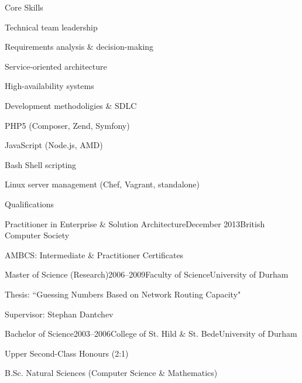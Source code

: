 \documentclass{cv}
\begin{document}
\begin{rSection}{Core Skills}

\begin{rSubsection}{}{}{}{}
\item Technical team leadership
\item Requirements analysis \& decision-making
\item Service-oriented architecture
\item High-availability systems
\item Development methodoligies \& SDLC
\item PHP5 (Composer, Zend, Symfony)
\item JavaScript (Node.js, AMD)
\item Bash Shell scripting
\item Linux server management (Chef, Vagrant, standalone)
\end{rSubsection}

\end{rSection}


\begin{rSection}{Qualifications}

\begin{rSubsection}{Practitioner in Enterprise \& Solution Architecture}{December 2013}{British Computer Society}{}
\item AMBCS: Intermediate \& Practitioner Certificates
\end{rSubsection}

\begin{rSubsection}{Master of Science (Research)}{2006--2009}{Faculty of Science}{University of Durham}
\item Thesis: ``Guessing Numbers Based on Network Routing Capacity"
\item Supervisor: Stephan Dantchev
\end{rSubsection}

\begin{rSubsection}{Bachelor of Science}{2003--2006}{College of St. Hild \& St. Bede}{University of Durham}
\item Upper Second-Class Honours (2:1)
\item B.Sc. Natural Sciences (Computer Science \& Mathematics)
\end{rSubsection}

\end{rSection}
\end{document}

